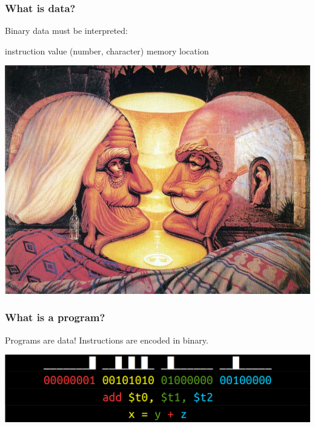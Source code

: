 \documentclass[11pt]{beamer}
\begin{document}
\begin{frame}
  \frametitle{What is data?}
  \Enlarge

  \begin{itemize}
    \myitem Binary data must be interpreted:
	\begin{itemize}
	  \mysubitem instruction \pause
	  \mysubitem value (number, character) \pause
	  \mysubitem memory location \pause
	\end{itemize}
  \end{itemize}
  \begin{centering}
  \includegraphics[height=0.5\textheight]{./img/dali.png}
  \end{centering}
\end{frame}

\begin{frame}
  \frametitle{What is a program?}
  \Enlarge

  \begin{itemize} \pause
    \myitem Programs are data! \pause
	\myitem Instructions are encoded in binary.
  \end{itemize}
  \includegraphics[width=\textwidth]{./img/assembler-4.png}
\end{frame}
\end{document}
